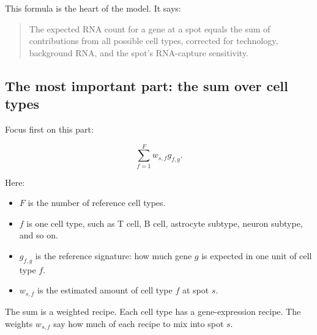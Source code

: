 \documentclass[11pt]{article}
\begin{document}
This formula is the heart of the model. It says:

\begin{quote}
The expected RNA count for a gene at a spot equals the sum of contributions from all possible cell types, corrected for technology, background RNA, and the spot's RNA-capture sensitivity.
\end{quote}

\subsection{The most important part: the sum over cell types}

Focus first on this part:

\[
\sum_{f=1}^{F} w_{s,f}g_{f,g}.
\]

Here:

\begin{itemize}
  \item $F$ is the number of reference cell types.
  \item $f$ is one cell type, such as T cell, B cell, astrocyte subtype, neuron subtype, and so on.
  \item $g_{f,g}$ is the reference signature: how much gene $g$ is expected in one unit of cell type $f$.
  \item $w_{s,f}$ is the estimated amount of cell type $f$ at spot $s$.
\end{itemize}

\begin{bigidea}
The sum is a weighted recipe. Each cell type has a gene-expression recipe. The weights $w_{s,f}$ say how much of each recipe to mix into spot $s$.
\end{bigidea}
\end{document}
